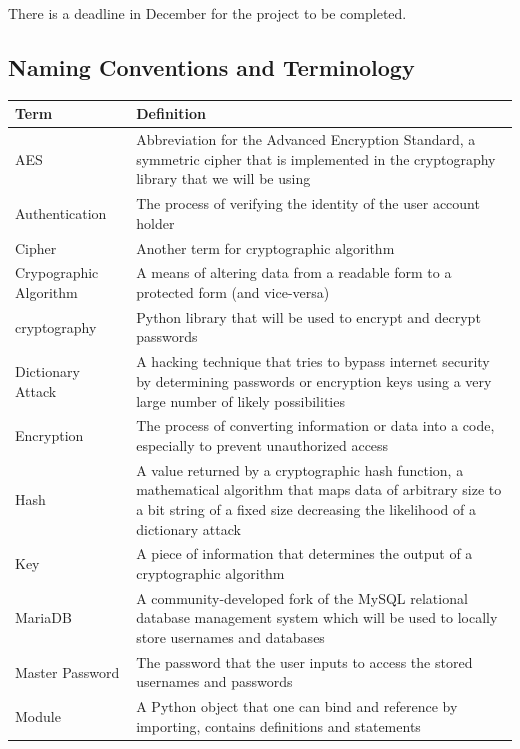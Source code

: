 \documentclass[12pt, titlepage]{article}
\begin{document}
There is a deadline in December for the project to be completed.

\subsection{Naming Conventions and Terminology}
\begin{table}
\begin{center}
\begin{tabular}{ | p{3cm} | p{10cm} | }
	\hline
	Term & Definition \\
	\hline
	AES & Abbreviation for the Advanced Encryption Standard, a symmetric cipher that is implemented in the cryptography library that we will be using \\
	\hline
	Authentication & The process of verifying the identity of the user account holder  \\
	\hline
	Cipher & Another term for cryptographic algorithm \\
	\hline
	Crypographic Algorithm & A means of altering data from a readable form to a protected form (and vice-versa) \\
	\hline
	cryptography & Python library that will be used to encrypt and decrypt passwords \\
	\hline
	Dictionary Attack & A hacking technique that tries to bypass internet security by determining passwords or encryption keys using a very large number of likely possibilities \\
	\hline
	Encryption & The process of converting information or data into a code, especially to prevent unauthorized access \\
	\hline
	Hash & A value returned by a cryptographic hash function, a mathematical algorithm that maps data of arbitrary size to a bit string of a fixed size decreasing the likelihood of a dictionary attack \\
	\hline
	Key & A piece of information that determines the output of a cryptographic algorithm \\
	\hline
	MariaDB & A community-developed fork of the MySQL relational database management system which will be used to locally store usernames and databases \\
	\hline
	Master Password & The password that the user inputs to access the stored usernames and passwords \\
	\hline
	Module & A Python object that one can bind and reference by importing, contains definitions and statements \\

\end{tabular}
\end{center}
\end{table}
\end{document}
